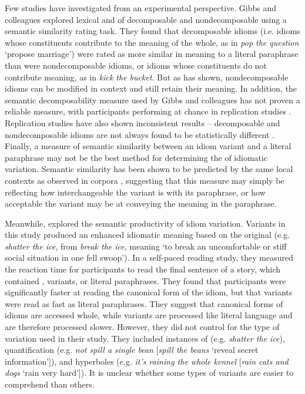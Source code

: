 \documentclass[output=paper
,modfonts
,nonflat]{langsci/langscibook}
\begin{document}
Few studies have investigated  from an experimental perspective. Gibbs and colleagues \citep{GibbsEtAl1989, GibbsNayak1989} explored lexical  and  of decomposable and nondecomposable  using a semantic similarity rating task. They found that decomposable  idioms (i.e. idioms whose constituents contribute to the meaning of the whole, as in \textit{pop the question} `propose marriage') were rated as more similar in meaning to a literal paraphrase  than were nondecomposable idioms, or idioms whose constituents do not contribute meaning, as in \textit{kick the bucket}. But as \citet{Duffley2013} has shown, nondecomposable idioms can be modified in context and still retain their meaning. In addition, the semantic decomposability measure used by Gibbs and colleagues has not proven a reliable measure, with participants performing at chance in replication studies \citep{TitoneConnine1994, TabossiEtAl2008}. Replication studies have also shown inconsistent results -- decomposable and nondecomposable idioms are not always found to be statistically different \citep{TabossiEtAl2008}. Finally, a measure of semantic similarity between an idiom variant and a literal paraphrase may not be the best method for determining the  of idiomatic variation. Semantic similarity has been shown to be predicted  by the same local contexts as observed in corpora \citep{MillerCharles1991}, suggesting that this measure may simply be reflecting how interchangeable the variant is with its paraphrase, or how acceptable  the variant may be at conveying the meaning in the paraphrase.

Meanwhile, \citet{McGloneEtAl1994} explored the semantic productivity of idiom variation.  Variants in this study produced an enhanced idiomatic meaning based on the original (e.g. \textit{shatter the ice}, from \textit{break the ice}, meaning `to break an uncomfortable or stiff social situation in one fell swoop'). In a self-paced reading study, they measured the reaction time for participants to read the final sentence of a story, which contained , variants, or literal paraphrases.  They found that participants were significantly faster at reading the canonical form of the idiom, but that variants were read as fast as literal paraphrases. They suggest that canonical forms of idioms are accessed whole, while variants are processed like literal language and are therefore processed slower. However, they did not control for the type of variation used in their study. They included instances of  (e.g. \textit{shatter the ice}), quantification (e.g. \textit{not spill a single bean} [\textit{spill the beans} `reveal secret information']), and hyperboles (e.g. \textit{it's raining the whole kennel} [\textit{rain cats and dogs} `rain very hard']). It is unclear whether some types of variants are easier to comprehend  than others. 
\end{document}
